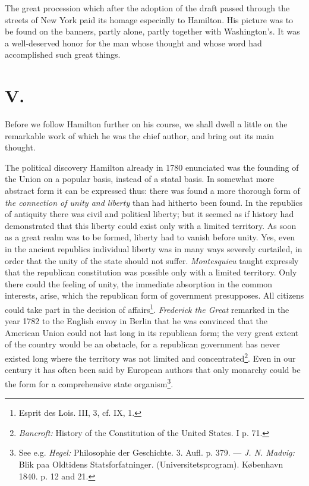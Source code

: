 \documentclass[12pt,a4paper,openany]{book}
\newcommand{\opage}[1]{\marginnote{\footnotesize\textit{[#1]}}}
\begin{document}
The great procession which after the adoption of the draft passed
through the streets of New York paid its homage especially to Hamilton.
His picture was to be found on the banners, partly alone, partly together
with Washington's. It was a well-deserved honor for the
man whose thought and whose word had accomplished such great things.

\section*{V.}

Before we follow Hamilton further on his course, we shall
dwell a little on the remarkable work of which he was the
chief author, and bring out its main thought.

The political discovery Hamilton already in 1780 enunciated
was the founding of the Union on a popular basis, instead
of a statal basis. In somewhat more abstract form
it can be expressed thus: there was found a more thorough form of
\emph{the connection of unity and liberty} than had hitherto been found.
In the republics of antiquity there was civil and political liberty;
but it seemed as if history had demonstrated that this
liberty could exist only with a limited territory.
As soon as a great realm was to be formed, liberty had to
vanish before unity. Yes, even in the ancient republics
\opage{133}individual liberty was in many ways severely curtailed, in order
that the unity of the state should not suffer. \emph{Montesquieu} taught
expressly that the republican constitution was possible only with a
limited territory. Only there could the feeling of unity,
the immediate absorption in the common interests, arise, which
the republican form of government presupposes. All citizens
could take part in the decision of affairs\footnote{Esprit des Lois. III, 3, cf. IX, 1.}. \emph{Frederick the Great}
remarked in the year 1782 to the English envoy in Berlin that he
was convinced that the American Union could not
last long in its republican form; the very great
extent of the country would be an obstacle, for a republican
government has never existed long where the territory
was not limited and concentrated\footnote{\emph{Bancroft:} History of the Constitution of the United States. I p. 71.}. Even in our century
it has often been said by European authors that only
monarchy could be the form for a comprehensive state organism\footnote{See e.g. \emph{Hegel:} Philosophie der Geschichte. 3. Aufl. p. 379. ---
\emph{J. N. Madvig:} Blik paa Oldtidens Statsforfatninger.
(Universitetsprogram). København 1840. p. 12 and 21.}.
\end{document}
